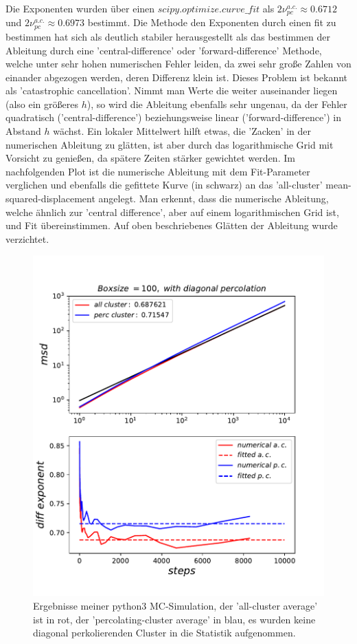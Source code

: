 \documentclass[a4paper, 12pt]{report}
\begin{document}
\newpage
\noindent Die Exponenten wurden über einen $scipy.optimize.curve\_fit$ als $2\nu_{pc}^{a.c.} \approx 0.6712$ und $2\nu_{pc}^{a.c.} \approx0.6973$ bestimmt. Die Methode den Exponenten durch einen fit zu bestimmen hat sich als deutlich stabiler herausgestellt als das bestimmen der Ableitung durch eine 'central-difference' oder 'forward-difference' Methode, welche unter sehr hohen numerischen Fehler leiden, da zwei sehr große Zahlen von einander abgezogen werden, deren Differenz klein ist. Dieses Problem ist bekannt als 'catastrophic cancellation'. Nimmt man Werte die weiter auseinander liegen (also ein größeres $h$), so wird die Ableitung ebenfalls sehr ungenau, da der Fehler quadratisch ('central-difference') beziehungsweise linear ('forward-difference') in Abstand $h$ wächst. Ein lokaler Mittelwert hilft etwas,
die 'Zacken' in der numerischen Ableitung zu glätten, ist aber durch das logarithmische Grid mit Vorsicht zu genießen, da spätere Zeiten stärker gewichtet werden. Im nachfolgenden Plot ist die numerische Ableitung mit dem Fit-Parameter verglichen und ebenfalls die gefittete Kurve (in schwarz) an das 'all-cluster' mean-squared-displacement angelegt. Man erkennt, dass die numerische Ableitung, welche ähnlich zur 'central difference', aber auf einem logarithmischen Grid ist, und Fit übereinstimmen. Auf oben beschriebenes Glätten der Ableitung wurde verzichtet. 
\begin{figure}[h!]
	\centering
	\includegraphics[scale=0.9]{newacpc100.pdf}
	\caption{Ergebnisse meiner python3 MC-Simulation, der 'all-cluster average' ist in rot, der 'percolating-cluster average' in blau, es wurden keine diagonal perkolierenden Cluster in die Statistik aufgenommen.}
\end{figure}
\newpage
\end{document}
